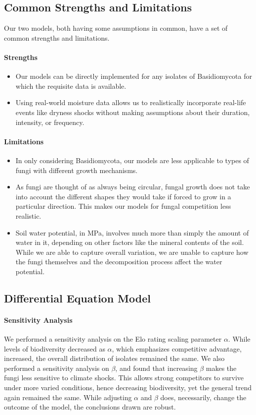 \documentclass[12pt]{article}
\begin{document}
\subsection{Common Strengths and Limitations}
Our two models, both having some assumptions in common, have a set of common strengths and limitations.
\paragraph{Strengths}
\begin{itemize}
    \item Our models can be directly implemented for any isolates of Basidiomycota for which the requisite data is available.
    \item Using real-world moisture data allows us to realistically incorporate real-life events like dryness shocks without making assumptions about their duration, intensity, or frequency.
\end{itemize}
\paragraph{Limitations}
\begin{itemize}
    \item In only considering Basidiomycota, our models are less applicable to types of fungi with different growth mechanisms.
    \item As fungi are thought of as always being circular, fungal growth does not take into account the different shapes they would take if forced to grow in a particular direction. This makes our models for fungal competition less realistic.
    \item Soil water potential, in MPa, involves much more than simply the amount of water in it, depending on other factors like the mineral contents of the soil. While we are able to capture overall variation, we are unable to capture how the fungi themselves and the decomposition process affect the water potential.
\end{itemize}

\subsection{Differential Equation Model}
\paragraph{Sensitivity Analysis}
We performed a sensitivity analysis on the Elo rating scaling parameter $\alpha$. While levels of biodiversity decreased as $\alpha$, which emphasizes competitive advantage, increased, the overall distribution of isolates remained the same. We also performed a sensitivity analysis on $\beta$, and found that increasing $\beta$ makes the fungi less sensitive to climate shocks. This allows strong competitors to survive under more varied conditions, hence decreasing biodiversity, yet the general trend again remained the same. While adjusting $\alpha$ and $\beta$ does, necessarily, change the outcome of the model, the conclusions drawn are robust.
\end{document}

